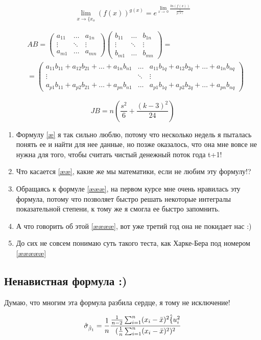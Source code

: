 \documentclass[12pt, a4paper]{article}
\begin{document}
\begin{equation*}
\lim_{x \to \{x_o} (f(x))^{g(x)} = e^{\lim\limits_{x \to\ 0}\frac{ln(f(x))}{\frac{1}{g(x)}}}
\tag{æææ}
\end{equation*}




\begin{equation} 
\begin{aligned} 
&AB = \begin{pmatrix}
a_{11} & \dots & a_{1n} \\
\vdots & \ddots & \vdots \\
a_{m1} & \dots & a_{mn}
\end{pmatrix}
\begin{pmatrix}
b_{11} & \dots & b_{1n} \\
\vdots & \ddots & \vdots \\
b_{m1} & \dots & b_{mn}
\end{pmatrix} = \\
&=\begin{pmatrix}
{a_{11}b_{11}+a_{12}b_{21}+\dots+a_{1n}b_{n1}} & \dots & {a_{11}b_{1q}+a_{12}b_{2q}+\dots+a_{1n}b_{nq}} \\
\vdots & \ddots & \vdots \\
{a_{p1}b_{11}+a_{p2}b_{21}+\dots +a_{pn}b_{n1}} & \dots & {a_{p1}b_{1q}+a_{p2}b_{2q}+\dots +a_{pn}b_{nq}}

\end{pmatrix}
\end{aligned} \tag{ææææ} 
\end{equation}

\begin{equation}
JB=n\left(\frac{s^2}{6}+\frac{(k-3)^2}{24}\right)
\tag{æææææ}
\end{equation}


\begin{enumerate}
 \item Формулу \ref{æ} я так сильно люблю, потому что несколько недель я пыталась понять ее и найти для нее данные, но позже оказалось, что она мне вовсе не нужна для того, чтобы считать чистый денежный поток года t+1!
 \item Что касается \ref{ææ}, какие же мы математики, если не любим эту формулу!?
 \item Обращаясь к формуле \ref{æææ}, на первом курсе мне очень нравилась эту формула, потому что позволяет быстро решать некоторые интегралы показательной степени, к тому же я смогла ее быстро запомнить.
 \item А что говорить об этой \ref{ææææ}, вот уже третий год она не покидает нас :)
 \item До сих не совсем понимаю суть такого теста, как Харке-Бера под номером \ref{æææææ}

\end{enumerate}

\subsection{Ненавистная формула :)}
Думаю, что многим эта формула разбила сердце, я тому не исключение!

\[\hat\sigma_{\hat\beta_1} = \frac{1}{n} \frac{\frac{1}{n-2}\sum_{i=1}^n(x_i-{\bar x})^2 {\hat\{u_i^2}}{(\frac{1}{n}\sum_{i=1}^n(x_i-{\bar x})^2)^2}\]
\end{document}
